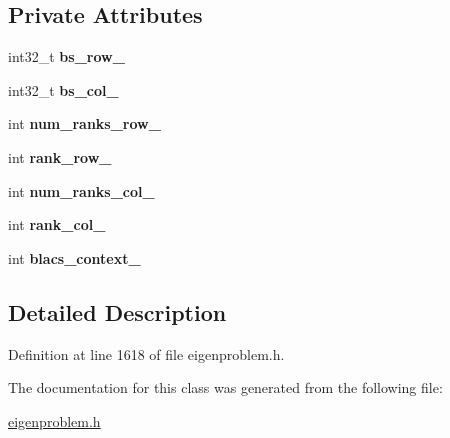 \subsection*{Private Attributes}
\begin{DoxyCompactItemize}
\item 
\hypertarget{class_eigenproblem___r_s___c_p_u_a1b5a4f12232d604dbb1dd401f6bab218}{}int32\+\_\+t {\bfseries bs\+\_\+row\+\_\+}\label{class_eigenproblem___r_s___c_p_u_a1b5a4f12232d604dbb1dd401f6bab218}

\item 
\hypertarget{class_eigenproblem___r_s___c_p_u_a81e0c425cb24744402c1f1a0ca349a84}{}int32\+\_\+t {\bfseries bs\+\_\+col\+\_\+}\label{class_eigenproblem___r_s___c_p_u_a81e0c425cb24744402c1f1a0ca349a84}

\item 
\hypertarget{class_eigenproblem___r_s___c_p_u_a65eea577088f15bd62e24a5c6e2f57bd}{}int {\bfseries num\+\_\+ranks\+\_\+row\+\_\+}\label{class_eigenproblem___r_s___c_p_u_a65eea577088f15bd62e24a5c6e2f57bd}

\item 
\hypertarget{class_eigenproblem___r_s___c_p_u_a23ab7de13d2adb19e70c8ccf3ae5aac1}{}int {\bfseries rank\+\_\+row\+\_\+}\label{class_eigenproblem___r_s___c_p_u_a23ab7de13d2adb19e70c8ccf3ae5aac1}

\item 
\hypertarget{class_eigenproblem___r_s___c_p_u_ad6acb7d15ca83797f082133629acaa4f}{}int {\bfseries num\+\_\+ranks\+\_\+col\+\_\+}\label{class_eigenproblem___r_s___c_p_u_ad6acb7d15ca83797f082133629acaa4f}

\item 
\hypertarget{class_eigenproblem___r_s___c_p_u_a4209ac1090aadaddea65dc40ee60a7c2}{}int {\bfseries rank\+\_\+col\+\_\+}\label{class_eigenproblem___r_s___c_p_u_a4209ac1090aadaddea65dc40ee60a7c2}

\item 
\hypertarget{class_eigenproblem___r_s___c_p_u_afce3066fd10858f900582ee9e9c4ec8a}{}int {\bfseries blacs\+\_\+context\+\_\+}\label{class_eigenproblem___r_s___c_p_u_afce3066fd10858f900582ee9e9c4ec8a}

\end{DoxyCompactItemize}


\subsection{Detailed Description}


Definition at line 1618 of file eigenproblem.\+h.



The documentation for this class was generated from the following file\+:\begin{DoxyCompactItemize}
\item 
\hyperlink{eigenproblem_8h}{eigenproblem.\+h}\end{DoxyCompactItemize}
